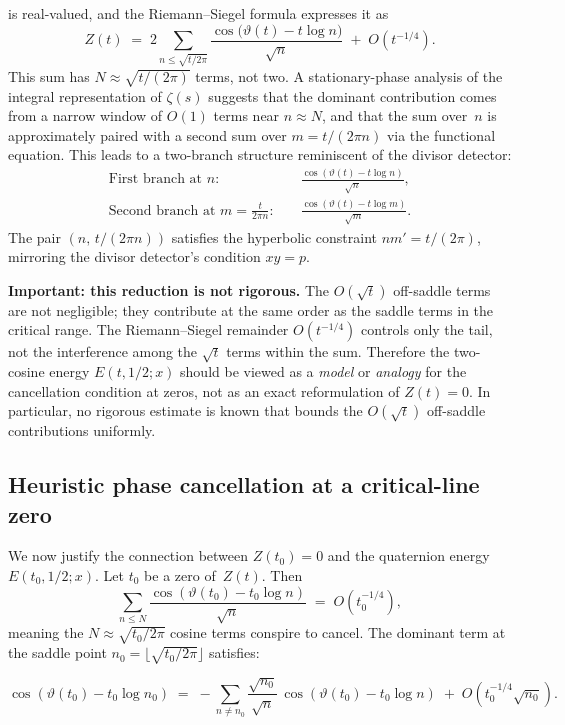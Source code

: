 \documentclass[12pt,a4paper]{article}
\begin{document}
\noindent is real-valued, and the Riemann--Siegel formula expresses it as
\[
Z(t) \;=\; 2\!\sum_{n \le \sqrt{t/2\pi}} \frac{\cos\bigl(\vartheta(t) - t\log n\bigr)}{\sqrt{n}} \;+\; O(t^{-1/4}).
\]
This sum has $N \approx \sqrt{t/(2\pi)}$ terms, not two. A stationary-phase analysis of the integral representation of $\zeta(s)$ suggests that the dominant contribution comes from a narrow window of $O(1)$ terms near $n \approx N$, and that the sum over~$n$ is approximately paired with a second sum over $m = t/(2\pi n)$ via the functional equation. This leads to a two-branch structure reminiscent of the divisor detector:
\begin{align*}
\text{First branch at } n\!: &\quad \frac{\cos(\vartheta(t) - t\log n)}{\sqrt{n}}, \\
\text{Second branch at } m = \frac{t}{2\pi n}\!: &\quad \frac{\cos(\vartheta(t) - t\log m)}{\sqrt{m}}.
\end{align*}
The pair $(n,\, t/(2\pi n))$ satisfies the hyperbolic constraint $nm' = t/(2\pi)$, mirroring the divisor detector's condition $xy = p$.

\begin{definitionbox}
\textbf{Important: this reduction is not rigorous.} The $O(\sqrt{t})$ off-saddle terms are not negligible; they contribute at the same order as the saddle terms in the critical range. The Riemann--Siegel remainder $O(t^{-1/4})$ controls only the tail, not the interference among the $\sqrt{t}$ terms within the sum. Therefore the two-cosine energy $E(t,1/2;x)$ should be viewed as a \emph{model} or \emph{analogy} for the cancellation condition at zeros, not as an exact reformulation of $Z(t)=0$. In particular, no rigorous estimate is known that bounds the $O(\sqrt{t})$ off-saddle contributions uniformly.
\end{definitionbox}

\subsection{Heuristic phase cancellation at a critical-line zero}

We now justify the connection between $Z(t_0)=0$ and the quaternion energy $E(t_0,1/2;x)$. Let $t_0$ be a zero of~$Z(t)$. Then
\[
\sum_{n \le N} \frac{\cos(\vartheta(t_0) - t_0\log n)}{\sqrt{n}} \;=\; O(t_0^{-1/4}),
\]
meaning the $N \approx \sqrt{t_0/2\pi}$ cosine terms conspire to cancel. The dominant term at the saddle point $n_0 = \lfloor\sqrt{t_0/2\pi}\rfloor$ satisfies:
\begin{mathblock}
\[
\cos(\vartheta(t_0) - t_0\log n_0) \;=\; -\sum_{n \ne n_0} \frac{\sqrt{n_0}}{\sqrt{n}}\,\cos(\vartheta(t_0) - t_0\log n) \;+\; O(t_0^{-1/4}\sqrt{n_0}).
\]
\end{mathblock}
\end{document}
